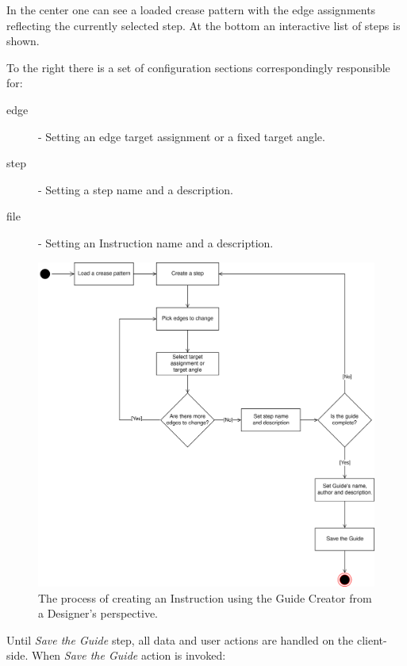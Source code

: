 In the center one can see a loaded crease pattern with the edge assignments reflecting the currently selected step. At the bottom an interactive list of steps is shown.

\medskip

To the right there is a set of configuration sections correspondingly responsible for: \begin{description}
	\item[edge] - Setting an edge target assignment or a fixed target angle.
	\item[step] - Setting a step name and a description.
	\item[file] - Setting an Instruction name and a description.
\end{description}

\medskip

\begin{figure}[H]
  \caption{The process of creating an Instruction using the Guide Creator from a Designer's perspective.}
  \label{3-designer-creator-flow}
  \centering
    \includegraphics[width=\textwidth]{assets/3-designer-creator-flow.png}
\end{figure}

Until \textit{Save the Guide} step, all data and user actions are handled on the client-side. When \textit{Save the Guide} action is invoked:

